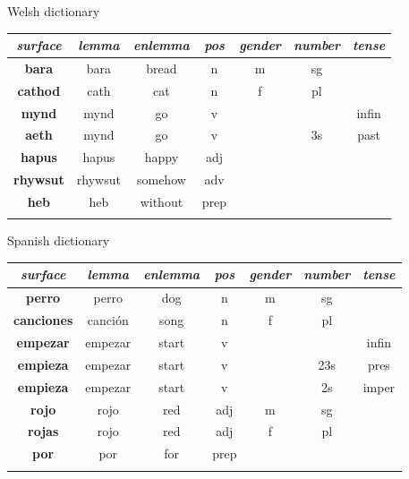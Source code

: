 \documentclass[hyperref={pdfpagelabels=false}, 14pt]{beamer}
\begin{document}
\begin{frame}{Welsh dictionary}
\begin{center}
\begin{small}
\begin{tabular}{ccccccc}
\textit{surface} & \textit{lemma} & \textit{enlemma} & \textit{pos} & \textit{gender} & \textit{number} & \textit{tense} \\
\hline\noalign{\smallskip}
\textbf{bara} & bara & bread & n & m & sg & \\
\hline\noalign{\smallskip}
\textbf{cathod} & cath & cat & n & f & pl & \\
\hline\noalign{\smallskip}
\textbf{mynd} & mynd & go & v & & & infin \\
\hline\noalign{\smallskip}
\textbf{aeth} & mynd & go & v & & 3s & past \\
\hline\noalign{\smallskip}
\textbf{hapus} & hapus & happy & adj & &  & \\
\hline\noalign{\smallskip}
\textbf{rhywsut} & rhywsut & somehow & adv & & & \\
\hline\noalign{\smallskip}
\textbf{heb} & heb & without & prep & & & \\
\hline\noalign{\smallskip}
\end{tabular}
\end{small}
\end{center}
\end{frame}


\begin{frame}{Spanish dictionary}
\begin{center}
\begin{small}
\begin{tabular}{ccccccc}
\textit{surface} & \textit{lemma} & \textit{enlemma} & \textit{pos} & \textit{gender} & \textit{number} & \textit{tense} \\
\hline\noalign{\smallskip}
\textbf{perro} & perro & dog & n & m & sg & \\
\hline\noalign{\smallskip}
\textbf{canciones} & canción & song & n & f & pl & \\
\hline\noalign{\smallskip}
\textbf{empezar} & empezar & start & v & & & infin \\
\hline\noalign{\smallskip}
\textbf{empieza} & empezar & start & v & & 23s & pres \\
\hline\noalign{\smallskip}
\textbf{empieza} & empezar & start & v & & 2s & imper \\
\hline\noalign{\smallskip}
\textbf{rojo} & rojo & red & adj & m & sg & \\
\hline\noalign{\smallskip}
\textbf{rojas} & rojo & red & adj & f & pl & \\
\hline\noalign{\smallskip}
\textbf{por} & por & for & prep & & & \\
\hline\noalign{\smallskip}
\end{tabular}
\end{small}
\end{center}
\end{frame}
\end{document}
